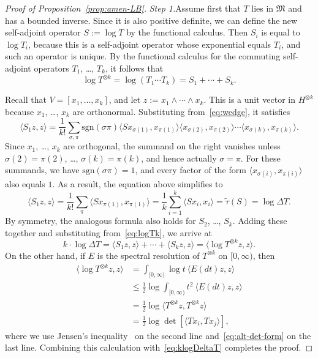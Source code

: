 \documentclass[12pt,a4paper]{article}
\numberwithin{equation}{section}
\theoremstyle{remark}
\renewcommand{\rm}[1]{\mathrm{#1}}
\newcommand{\M}{\mathfrak{M}}
\newcommand{\s}{\sigma}
\renewcommand{\t}[1]{\widetilde{#1}}
\begin{document}
\begin{proof}[Proof of Proposition~\ref{prop:amen-LB}]
\emph{Step 1.}\quad Assume first that $T$ lies in $\M$ and has a bounded inverse.  Since it is also positive definite, we can define the new self-adjoint operator $S := \log T$ by the functional calculus.  Then $S_i$ is equal to $\log T_i$, because this is a self-adjoint operator whose exponential equals $T_i$, and such an operator is unique.  By the functional calculus for the commuting self-adjoint operators $T_1$, \dots, $T_k$, it follows that
\begin{equation}\label{eq:logTk}
\log T^{\otimes k} = \log(T_1\cdots T_k) = S_1 + \cdots + S_k.
\end{equation}

Recall that $V = [x_1,\dots,x_k]$, and let $z := {x_1\wedge \cdots \wedge x_k}$.  This is a unit vector in $H^{\otimes k}$ because $x_1$, \dots, $x_k$ are orthonormal.  Substituting from~\eqref{eq:wedge}, it satisfies
\[\langle S_1z,z\rangle = \frac{1}{k!}\sum_{\s,\pi}\rm{sgn}(\s\pi) \langle Sx_{\s(1)},x_{\pi(1)}\rangle \langle x_{\s(2)},x_{\pi(2)}\rangle\cdots \langle x_{\s(k)},x_{\pi(k)}\rangle.\]
Since $x_1$, \dots, $x_k$ are orthogonal, the summand on the right vanishes unless $\s(2) = \pi(2)$, \dots, $\s(k) = \pi(k)$, and hence actually $\s = \pi$.  For these summands, we have $\rm{sgn}(\s\pi) = 1$, and every factor of the form $\langle x_{\s(i)},x_{\pi(i)}\rangle$ also equals $1$.  As a result, the equation above simplifies to
\[\langle S_1z,z\rangle = \frac{1}{k!}\sum_\pi \langle Sx_{\pi(1)},x_{\pi(1)}\rangle= \frac{1}{k}\sum_{i=1}^k \langle Sx_i,x_i\rangle= \t{\tau}(S)= \log \Delta T.\]
By symmetry, the analogous formula also holds for $S_2$, \dots, $S_k$.  Adding these together and substituting from~\eqref{eq:logTk}, we arrive at
\begin{equation}\label{eq:klogDeltaT}
k\cdot \log\Delta T = \langle S_1z,z\rangle + \cdots + \langle S_kz,z\rangle = \langle \log T^{\otimes k}z,z\rangle.
\end{equation}
On the other hand, if $E$ is the spectral resolution of $T^{\otimes k}$ on $[0,\infty)$, then
\begin{align*}
\langle \log T^{\otimes k}z,z\rangle &= \int_{[0,\infty)} \log t\ \langle E(dt)z,z\rangle \\
&\le \frac{1}{2}\log \int_{[0,\infty)}t^2\ \langle E(dt)z,z\rangle \\
&= \frac{1}{2}\log \langle T^{\otimes k}z,T^{\otimes k}z\rangle \\
&= \frac{1}{2}\log \det [\langle Tx_i,Tx_j\rangle],
\end{align*}
where we use Jensen's inequality~\cite[Thm. 3.3]{Rudin--realcplx} on the second line and~\eqref{eq:alt-det-form} on the last line.  Combining this calculation with~\eqref{eq:klogDeltaT} completes the proof.


\end{proof}
\end{document}
